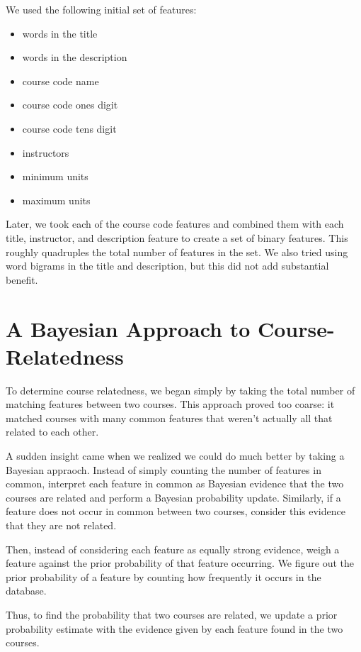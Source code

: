 \documentclass[12pt]{article}
\begin{document}
We used the following initial set of features: 

\begin{itemize}
\item words in the title
\item words in the description
\item course code name
\item course code ones digit
\item course code tens digit
\item instructors
\item minimum units
\item maximum units
\end{itemize}  

Later, we took each of the course code features and combined them with
each title, instructor, and description feature to create a set of
binary features. This roughly quadruples the total number of features
in the set. We also tried using word bigrams in the title and
description, but this did not add substantial benefit.

\section*{A Bayesian Approach to Course-Relatedness}

To determine course relatedness, we began simply by taking the total
number of matching features between two courses. This approach proved
too coarse: it matched courses with many common features that weren't
actually all that related to each other.

A sudden insight came when we realized we could do much better by
taking a Bayesian appraoch. Instead of simply counting the number of
features in common, interpret each feature in common as Bayesian
evidence that the two courses are related and perform a Bayesian
probability update. Similarly, if a feature does not occur in common
between two courses, consider this evidence that they are not related.

Then, instead of considering each feature as equally strong evidence,
weigh a feature against the prior probability of that feature
occurring. We figure out the prior probability of a feature by
counting how frequently it occurs in the database.

Thus, to find the probability that two courses are related, we update
a prior probability estimate with the evidence given by each feature
found in the two courses.
\end{document}
